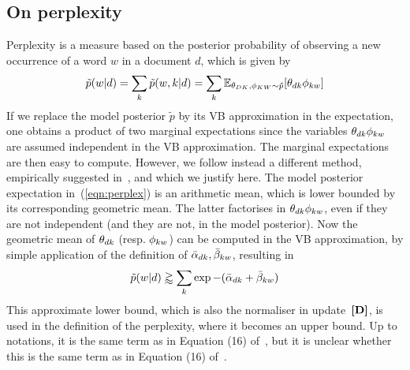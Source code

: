 \subsection{On perplexity}
Perplexity is a measure based on the posterior probability of observing a new occurrence of a word $w$ in a document $d$, which is given by
\begin{equation}
\label{eqn:perplex}
\tilde{p}(w|d) =
\sum_k\tilde{p}(w,k|d) =
\sum_k\mathbb{E}_{\theta_{DK},\phi_{KW}\sim\tilde{p}}[\theta_{dk}\phi_{kw}]
\end{equation}
If we replace the model posterior $\tilde{p}$ by its VB approximation in the expectation, one obtains a product of two marginal expectations since the variables $\theta_{dk}\phi_{kw}$ are assumed independent in the VB approximation. The marginal expectations are then easy to compute. However, we follow instead a different method, empirically suggested in~\cite{asuncion_smoothing_2009}, and which we justify here. The model posterior expectation in~(\ref{eqn:perplex}) is an arithmetic mean, which is lower bounded by its corresponding geometric mean. The latter factorises in $\theta_{dk}\phi_{kw}$, even if they are not independent (and they are not, in the model posterior). Now the geometric mean of $\theta_{dk}$ (resp. $\phi_{kw}$) can be computed in the VB approximation, by simple application of the definition of $\bar{\alpha}_{dk},\bar{\beta}_{kw}$, resulting in
\begin{equation*}
\tilde{p}(w|d) \gtrapprox \sum_k\exp-(\bar{\alpha}_{dk}+\bar{\beta}_{kw})
\end{equation*}
This approximate lower bound, which is also the normaliser in update~$\textbf{[D]}$, is used in the definition of the perplexity, where it becomes an upper bound. Up to notations, it is the same term as in Equation (16) of~\cite{asuncion_smoothing_2009}, but it is unclear whether this is the same term as in Equation (16) of~\cite{hoffman_online_2010}.